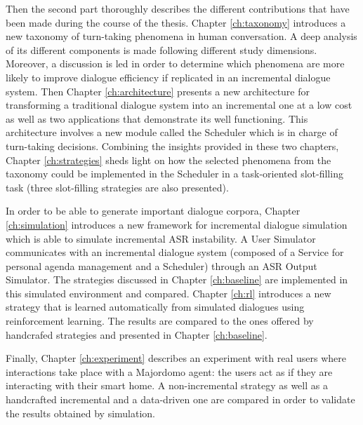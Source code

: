 				Then the second part thoroughly describes the different contributions that have been made during the course of the thesis. Chapter \ref{ch:taxonomy} introduces a new taxonomy of turn-taking phenomena in human conversation. A deep analysis of its different components is made following different study dimensions. Moreover, a discussion is led in order to determine which phenomena are more likely to improve dialogue efficiency if replicated in an incremental dialogue system. Then Chapter \ref{ch:architecture} presents a new architecture for transforming a traditional dialogue system into an incremental one at a low cost as well as two applications that demonstrate its well functioning. This architecture involves a new module called the Scheduler which is in charge of turn-taking decisions. Combining the insights provided in these two chapters, Chapter \ref{ch:strategies} sheds light on how the selected phenomena from the taxonomy could be implemented in the Scheduler in a task-oriented slot-filling task (three slot-filling strategies are also presented).
				
				In order to be able to generate important dialogue corpora, Chapter \ref{ch:simulation} introduces a new framework for incremental dialogue simulation which is able to simulate incremental ASR instability. A User Simulator communicates with an incremental dialogue system (composed of a Service for personal agenda management and a Scheduler) through an ASR Output Simulator. The strategies discussed in Chapter \ref{ch:baseline} are implemented in this simulated environment and compared. Chapter \ref{ch:rl} introduces a new strategy that is learned automatically from simulated dialogues using reinforcement learning. The results are compared to the ones offered by handcrafed strategies and presented in Chapter \ref{ch:baseline}.
				
				Finally, Chapter \ref{ch:experiment} describes an experiment with real users where interactions take place with a Majordomo agent: the users act as if they are interacting with their smart home. A non-incremental strategy as well as a handcrafted incremental and a data-driven one are compared in order to validate the results obtained by simulation.
